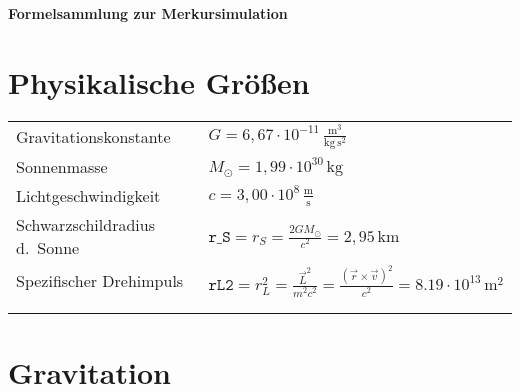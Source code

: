 \documentclass[a4paper, 14pt, fleqn, notitlepage]{scrartcl}
\author{\theauthor}
\title{\vspace{-4em}\thetitle}
\date{\thedate}
\newcommand{\thetitle}{Formelsammlung zur Merkursimulation}
\newcommand{\unit}[1]{\,\text{#1}}
\begin{document}
\sffamily
\pagestyle{empty}

\begin{center}
  \textbf{\textsf{\huge\thetitle}}
\end{center}

\begin{center}
  \color{black!50!white}{\rule{\textwidth}{1pt}}
\end{center}
\vspace{-2.5em}
\section{Physikalische Größen}

\begin{tabular}{ll}
  Gravitationskonstante & $G = 6,67 \cdot 10^{-11} \, \frac{\text{m}^3}{\text{kg}\,\text{s}^2}$\\
  Sonnenmasse & $M_\odot = 1,99 \cdot 10^{30} \unit{kg}$\\
  Lichtgeschwindigkeit & $c = 3,00 \cdot 10^{8} \, \frac{\text{m}}{\text{s}}$\\[1em]
  Schwarzschildradius d.\ Sonne & $\mathtt{r\_S} = r_S = \frac{2 G M_\odot}{c^2} = 2,95 \unit{km}$\\
  Spezifischer Drehimpuls & $\mathtt{rL2} = r_L^2 = \frac{\vec{L}^2}{m^2 c^2} = \frac{{(\vec{r} \times \vec{v})}^2}{c^2} = 8.19 \cdot 10^{13} \,\text{m}^2$\\[1em]
  \color{black!75!white}{Referenzlänge} & \color{black!75!white}{$R_0 = 10^{10} \unit{m}$}\\
  \color{black!75!white}{Referenzzeit} & \color{black!75!white}{$T_0 = 1 \unit{d}$}
\end{tabular}

\vspace{1em}
\begin{center}
  \color{black!50!white}{\rule{\textwidth}{1pt}}
\end{center}
\vspace{-1.5em}
\begin{minipage}[t]{1.0\paperwidth}
  \section{Gravitation}
\end{minipage}\\[0.6em]
\end{document}
